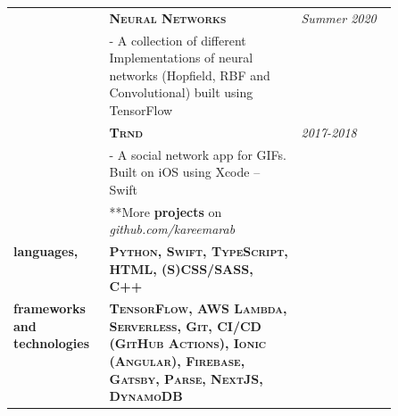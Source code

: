 \documentclass{article}
\begin{document}
\begin{longtable}{@{}>{\raggedleft}p{0.25\linewidth}
                          p{}>{}p{0.25\linewidth}@{}}
            & \textbf{\textsc{Neural Networks}} & \textit{Summer 2020} \\
            & - A collection of different Implementations of neural networks (Hopfield, RBF and Convolutional) built using TensorFlow \\ [2em]

            & \textbf{\textsc{Trnd}} & \textit{2017-2018} \\
            & - A social network app for GIFs. Built on iOS using Xcode -- Swift \\ [1em]

            & **More \textbf{projects} on \textit{github.com/kareemarab}\\ [1em]

        \textbf{languages,}
            & \textbf{\textsc{Python, Swift, TypeScript, HTML, (S)CSS/SASS, C++}} \\
        \textbf{frameworks and technologies}
            & \textbf{\textsc{TensorFlow, AWS Lambda, Serverless, Git, CI/CD (GitHub Actions), Ionic (Angular), Firebase, Gatsby, Parse, NextJS, DynamoDB}}\\ [1em]

  \end{longtable}
\end{document}
